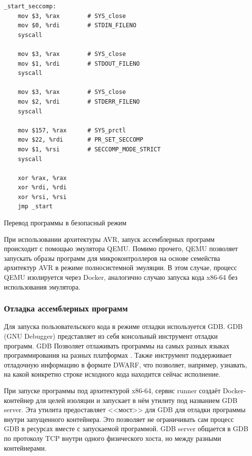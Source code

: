 \documentclass[a4paper,article,14pt]{extarticle}
\begin{document}
\begin{listing}[ht]
\begin{verbatim}
_start_seccomp:
    mov $3, %rax        # SYS_close
    mov $0, %rdi        # STDIN_FILENO
    syscall

    mov $3, %rax        # SYS_close
    mov $1, %rdi        # STDOUT_FILENO
    syscall

    mov $3, %rax        # SYS_close
    mov $2, %rdi        # STDERR_FILENO
    syscall

    mov $157, %rax      # SYS_prctl
    mov $22, %rdi       # PR_SET_SECCOMP
    mov $1, %rsi        # SECCOMP_MODE_STRICT
    syscall

    xor %rax, %rax
    xor %rdi, %rdi
    xor %rsi, %rsi
    jmp _start
\end{verbatim}
\caption{Перевод программы в безопасный режим}
\label{lst:seccomp}
\end{listing}

При использовании архитектуры AVR, запуск ассемблерных программ происходит с помощью эмулятора QEMU. Помимо прочего, QEMU позволяет запускать образы программ для микроконтроллеров на основе семейства архитектур AVR в режиме полносистемной эмуляции. В этом случае, процесс QEMU изолируется через Docker, аналогично случаю запуска кода x86-64 без использования эмулятора.

\subsubsection{Отладка ассемблерных программ}

Для запуска пользовательского кода в режиме отладки используется GDB. GDB (GNU Debugger) представляет из себя консольный инструмент отладки программ. GDB Позволяет отлаживать программы на самых разных языках программирования на разных платформах \cite{gdb}. Также инструмент поддерживает отладочную информацию в формате DWARF, что позволяет, например, узнавать, на какой конкретно строке исходного кода находится сейчас исполнение.

При запуске программы под архитектурой x86-64, сервис runner создаёт Docker-контейнер для целей изоляции и запускает в нём утилиту под названием GDB server. Эта утилита предоставляет <<мост>> для GDB для отладки программы внутри запущенного контейнера. Это позволяет не ограничивать сам процесс GDB в ресурсах вместе с запускаемой программой. GDB server общается в GDB по протоколу TCP внутри одного физического хоста, но между разными контейнерами.
\end{document}
